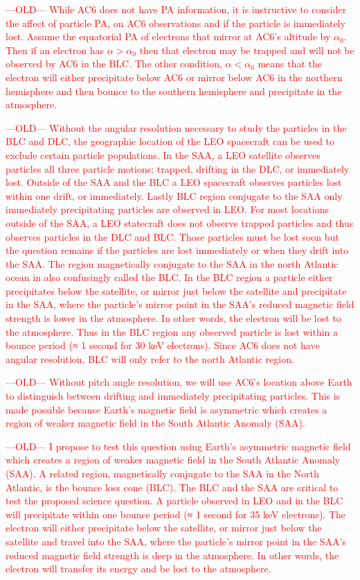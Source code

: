 \documentclass[draft]{agujournal2019}
\begin{document}
\textcolor{red}{---OLD--- While AC6 does not have PA information, it is instructive to consider the affect of particle PA, on AC6 observations and if the particle is immediately lost. Assume the equatorial PA of electrons that mirror at AC6's altitude by $\alpha_0$. Then if an electron has $\alpha > \alpha_0$ then that electron may be trapped and will not be observed by AC6 in the BLC. The other condition, $\alpha < \alpha_0$ means that the electron will either precipitate below AC6 or mirror below AC6 in the northern hemisphere and then bounce to the southern hemisphere and precipitate in the atmosphere.}

\textcolor{red}{---OLD--- Without the angular resolution necessary to study the particles in the BLC and DLC, the geographic location of the LEO spacecraft can be used to exclude certain particle populations. In the SAA, a LEO satellite observes particles all three particle motions: trapped, drifting in the DLC, or immediately lost. Outside of the SAA and the BLC a LEO spacecraft observes particles lost within one drift, or immediately. Lastly BLC region conjugate to the SAA only immediately precipitating particles are observed in LEO. For most locations outside of the SAA, a LEO statecraft does not observe trapped particles and thus observes particles in the DLC and BLC. Those particles must be lost soon but the question remains if the particles are lost immediately or when they drift into the SAA. The region magnetically conjugate to the SAA in the north Atlantic ocean in also confusingly called the BLC. In the BLC region a particle either precipitates below the satellite, or mirror just below the satellite and precipitate in the SAA, where the particle’s mirror point in the SAA’s reduced magnetic field strength is lower in the atmosphere. In other words, the electron will be lost to the atmosphere. Thus in the BLC region any observed particle is lost within a bounce period (≈ 1 second for 30 keV electrons). Since AC6 does not have angular resolution, BLC will only refer to the north Atlantic region.}

\textcolor{red}{---OLD--- Without pitch angle resolution, we will use AC6's location above Earth to distinguish between drifting and immediately precipitating particles. This is made possible because Earth’s magnetic field is asymmetric which creates a region of weaker magnetic field in the South Atlantic Anomaly (SAA).}

\textcolor{red}{---OLD--- I propose to test this question using Earth’s asymmetric magnetic field which creates a region of weaker magnetic field in the South Atlantic Anomaly (SAA). A related region, magnetically conjugate to the SAA in the North Atlantic, is the bounce loss cone (BLC). The BLC and the SAA are critical to test the proposed science question. A particle observed in LEO and in the BLC will precipitate within one bounce period (≈ 1 second for 35 keV electrons). The electron will either precipitate below the satellite, or mirror just below the satellite and travel into the SAA, where the particle’s mirror point in the SAA’s reduced magnetic field strength is deep in the atmosphere. In other words, the electron will transfer its energy and be lost to the atmosphere.}
\fi
\end{document}
